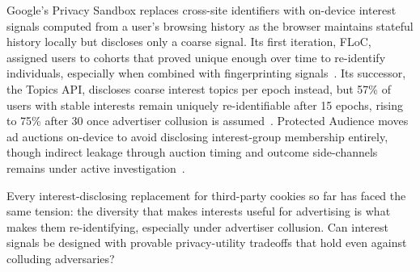 %
Google's Privacy Sandbox replaces cross-site identifiers with on-device interest signals computed from a user's browsing history as the browser maintains stateful history locally but discloses only a coarse signal.
%
Its first iteration, FLoC, assigned users to cohorts that proved unique enough over time to re-identify individuals, especially when combined with fingerprinting signals~\cite{berkePrivacyLimitationsInterestbased2022}.
%
Its successor, the Topics API, discloses coarse interest topics per epoch instead, but 57\% of users with stable interests remain uniquely re-identifiable after 15 epochs, rising to 75\% after 30 once advertiser collusion is assumed~\cite{jhaRobustnessTopicsAPI2023,beuginInterestdisclosingMechanismsAdvertising2024}.
%
Protected Audience moves ad auctions on-device to avoid disclosing interest-group membership entirely, though indirect leakage through auction timing and outcome side-channels remains under active investigation~\cite{calderonioFledgingWillContinue2024,aliNavigatingMurkyWaters2023}.

\begin{opbox}
Every interest-disclosing replacement for third-party cookies so far has faced the same tension: the diversity that makes interests useful for advertising is what makes them re-identifying, especially under advertiser collusion. Can interest signals be designed with provable privacy-utility tradeoffs that hold even against colluding adversaries?
\end{opbox}




